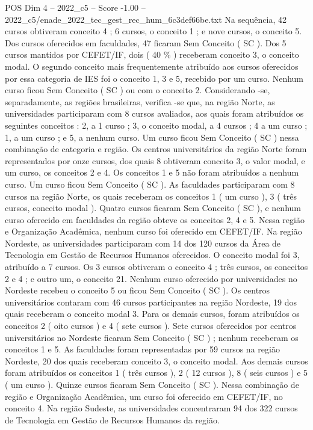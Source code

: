 \begin{textsample}{POS Dim 4 – 2022\_c5 – Score -1.00 – 2022\_c5/enade\_2022\_tec\_gest\_rec\_hum\_6c3def66be.txt}
Na sequência, 42 cursos obtiveram conceito 4 ; 6 cursos, o conceito 1 ; e nove cursos, o conceito 5.
Dos cursos oferecidos em faculdades, 47 ficaram Sem Conceito ( SC ).
Dos 5 cursos mantidos por CEFET/IF, dois ( 40 \% ) receberam conceito 3, o conceito modal.
O segundo conceito mais frequentemente atribuído aos cursos oferecidos por essa categoria de IES foi o conceito 1, 3 e 5, recebido por um curso.
Nenhum curso ficou Sem Conceito ( SC ) ou com o conceito 2.
Considerando -se, separadamente, as regiões brasileiras, verifica -se que, na região Norte, as universidades participaram com 8 cursos avaliados, aos quais foram atribuídos os seguintes conceitos : 2, a 1 curso ; 3, o conceito modal, a 4 cursos ; 4 a um curso ; 1, a um curso ; e 5, a nenhum curso.
Um curso ficou Sem Conceito ( SC ) nessa combinação de categoria e região.
Os centros universitários da região Norte foram representados por onze cursos, dos quais 8 obtiveram conceito 3, o valor modal, e um curso, os conceitos 2 e 4.
Os conceitos 1 e 5 não foram atribuídos a nenhum curso.
Um curso ficou Sem Conceito ( SC ).
As faculdades participaram com 8 cursos na região Norte, os quais receberam os conceitos 1 ( um curso ), 3 ( três cursos, conceito modal ).
Quatro cursos ficaram Sem Conceito ( SC ), e nenhum curso oferecido em faculdades da região obteve os conceitos 2, 4 e 5.
Nessa região e Organização Acadêmica, nenhum curso foi oferecido em CEFET/IF.
Na região Nordeste, as universidades participaram com 14 dos 120 cursos da Área de Tecnologia em Gestão de Recursos Humanos oferecidos.
O conceito modal foi 3, atribuído a 7 cursos.
Os 3 cursos obtiveram o conceito 4 ; três cursos, os conceitos 2 e 4 ; e outro um, o conceito 21.
Nenhum curso oferecido por universidades no Nordeste recebeu o conceito 5 ou ficou Sem Conceito ( SC ).
Os centros universitários contaram com 46 cursos participantes na região Nordeste, 19 dos quais receberam o conceito modal 3.
Para os demais cursos, foram atribuídos os conceitos 2 ( oito cursos ) e 4 ( sete cursos ).
Sete cursos oferecidos por centros universitários no Nordeste ficaram Sem Conceito ( SC ) ; nenhum receberam os conceitos 1 e 5.
As faculdades foram representadas por 59 cursos na região Nordeste, 20 dos quais receberam conceito 3, o conceito modal.
Aos demais cursos foram atribuídos os conceitos 1 ( três cursos ), 2 ( 12 cursos ), 8 ( seis cursos ) e 5 ( um curso ).
Quinze cursos ficaram Sem Conceito ( SC ).
Nessa combinação de região e Organização Acadêmica, um curso foi oferecido em CEFET/IF, no conceito 4.
Na região Sudeste, as universidades concentraram 94 dos 322 cursos de Tecnologia em Gestão de Recursos Humanos da região.

\end{textsample}
